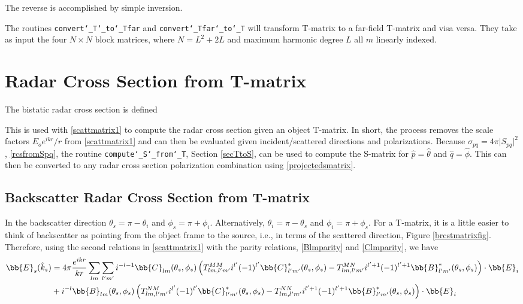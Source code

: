 The reverse is accomplished by simple inversion.

The routines  \texttt{convert\char`_T\char`_to\char`_Tfar} and  \texttt{convert\char`_Tfar\char`_to\char`_T} will transform T-matrix to a far-field T-matrix and visa versa. They take as input the four $N \times N$ block matrices, where $N = L^2 + 2L$ and maximum harmonic degree $L$ all $m$ linearly indexed.   


{\footnotesize
{}
}

{\footnotesize
{}
}


\clearpage
\newpage
\section{Radar Cross Section from T-matrix}

The bistatic radar cross section is defined 

This is used with \eqref{scattmatrix1} to compute the radar cross section given an object T-matrix. In short, the process removes the scale factors $E_o e^{ikr}/r$ from \eqref{scattmatrix1} and can then be evaluated given incident/scattered directions and polarizations.  Because $\sigma_{pq} = 4\pi \vert S_{pq}\vert^2$, \eqref{rcsfromSpq}, the routine \texttt{compute\char`_S\char`_from\char`_T}, Section \ref{secTtoS}, can be used to compute the S-matrix for $\hat{p} = \hat{\theta}$ and $\hat{q} = \hat{\phi}$. This can then be converted to any radar cross section polarization combination using \eqref{projectedsmatrix}. 

\subsection{Backscatter Radar Cross Section from T-matrix}

In the backscatter direction $\theta_s = \pi-\theta_i$ and $\phi_s = \pi+\phi_i$.  Alternatively, $\theta_i = \pi - \theta_s$ and $\phi_i = \pi + \phi_s$.  For a T-matrix, it is a little easier to think of backscatter as pointing from the object frame to the source, i.e., in terms of the scattered direction, Figure \ref{brcstmatrixfig}. Therefore, using the second relations in \eqref{scattmatrix1} with the parity relations, \eqref{Blmparity} and \eqref{Clmparity}, we have
\begin{align}
\bb{E}_s(\hat{k}_s) &= 4\pi\dfrac{e^{ikr}}{kr}  \sum_{lm}\sum_{l'm'} i^{-l-1} \bb{C}_{lm}(\theta_s,\phi_s)\left(T^{MM}_{lm,l'm'} i^{l'} (-1)^{l'} \bb{C}^*_{l'm'}(\theta_s,\phi_s)  - T^{MN}_{lm,l'm'} i^{l'+1} (-1)^{l'+1} \bb{B}^*_{l'm'}(\theta_s,\phi_s)  \right)\cdot  \bb{E}_i   \nonumber \\
\ &   + i^{-l}  \bb{B}_{lm}(\theta_s,\phi_s)\left(T^{NM}_{lm,l'm'} i^{l'} (-1)^{l'} \bb{C}^*_{l'm'}(\theta_s,\phi_s)  - T^{NN}_{lm,l'm'} i^{l'+1} (-1)^{l'+1} \bb{B}^*_{l'm'}(\theta_s,\phi_s)  \right)\cdot  \bb{E}_i    \end{align}

